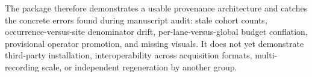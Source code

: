 The package therefore demonstrates a usable provenance architecture and catches
the concrete errors found during manuscript audit: stale cohort counts,
occurrence-versus-site denominator drift, per-lane-versus-global budget
conflation, provisional operator promotion, and missing visuals. It does not yet
demonstrate third-party installation, interoperability across acquisition
formats, multi-recording scale, or independent regeneration by another group.
